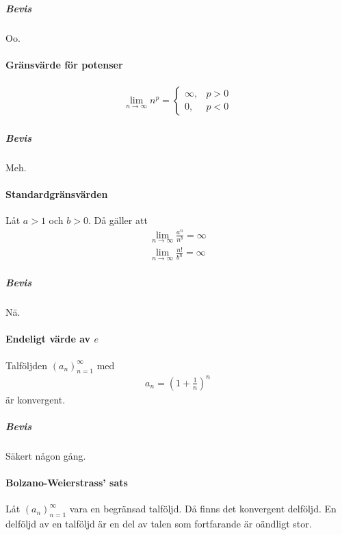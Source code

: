 \subparagraph{Bevis}
Oo.

\paragraph{Gränsvärde för potenser}
\begin{align*}
	\lim_{n\to\infty} n^p =
	\begin{cases}
		\infty, & p > 0\\
		0,      & p < 0
	\end{cases}
\end{align*}

\subparagraph{Bevis}
Meh.

\paragraph{Standardgränsvärden}
Låt $a > 1$ och $b > 0$. Då gäller att
\begin{align*}
	\lim_{n\to\infty}\frac{a^n}{n^b} = \infty \\
	\lim_{n\to\infty}\frac{n!}{b^n} = \infty
\end{align*}

\subparagraph{Bevis}
Nä.

\paragraph{Endeligt värde av $e$}
Talföljden $\left(a_n\right)_{n = 1}^\infty$ med
\begin{align*}
	a_n = \left(1 + \frac{1}{n}\right)^{n}
\end{align*}
är konvergent.

\subparagraph{Bevis}
Säkert någon gång.

\paragraph{Bolzano-Weierstrass' sats}
Låt $\left(a_n\right)_{n = 1}^\infty$ vara en begränsad talföljd. Då finns det konvergent delföljd. En delföljd av en talföljd är en del av talen som fortfarande är oändligt stor.